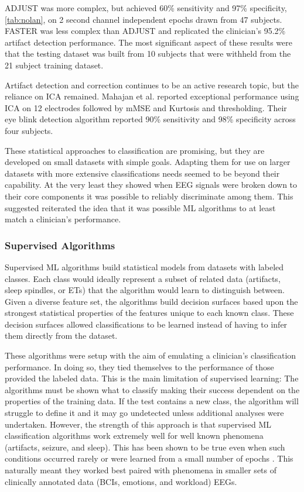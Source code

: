 \ac{ADJUST} was more complex, but achieved 60\% sensitivity and 97\% specificity, \cref{tab:nolan}, on 2 second channel independent epochs drawn from 47 subjects. \ac{FASTER} was less complex than \ac{ADJUST} and replicated the clinician's 95.2\% artifact detection performance. The most significant aspect of these results were that the testing dataset was built from 10 subjects that were withheld from the 21 subject training dataset.

Artifact detection and correction continues to be an active research topic, but the reliance on \ac{ICA} remained. Mahajan et al.\cite{Mahajan2015} reported exceptional performance using \ac{ICA} on 12 electrodes followed by \ac{mMSE} and Kurtosis and thresholding. Their eye blink detection algorithm reported 90\% sensitivity and 98\% specificity across four subjects.

These statistical approaches to classification are promising, but they are developed on small datasets with simple goals. Adapting them for use on larger datasets with more extensive classifications needs seemed to be beyond their capability. At the very least they showed when \ac{EEG} signals were broken down to their core components it was possible to reliably discriminate among them. This suggested reiterated the idea that it was possible \ac{ML} algorithms to at least match a clinician's performance.

\subsubsection{Supervised Algorithms}

Supervised \ac{ML} algorithms build statistical models from datasets with labeled classes. Each class would ideally represent a subset of related data (artifacts, sleep spindles, or \acp{ET}) that the algorithm would learn to distinguish between. Given a diverse feature set, the algorithms build decision surfaces based upon the strongest statistical properties of the features unique to each known class. These decision surfaces allowed classifications to be learned instead of having to infer them directly from the dataset.

These algorithms were setup with the aim of emulating a clinician's classification performance. In doing so, they tied themselves to the performance of those provided the labeled data. This is the main limitation of supervised learning: The algorithms must be shown what to classify making their success dependent on the properties of the training data. If the test contains a new class, the algorithm will struggle to define it and it may go undetected unless additional analyses were undertaken. However, the strength of this approach is that supervised \ac{ML} classification algorithms work extremely well for well known phenomena (artifacts, seizure, and sleep). This has been shown to be true even when such conditions occurred rarely or  were learned from a small number of epochs \cite{Kindermans2014d}. This naturally meant they worked best paired with phenomena in smaller sets of clinically annotated data (\acp{BCI}, emotions, and workload) \acp{EEG}.

